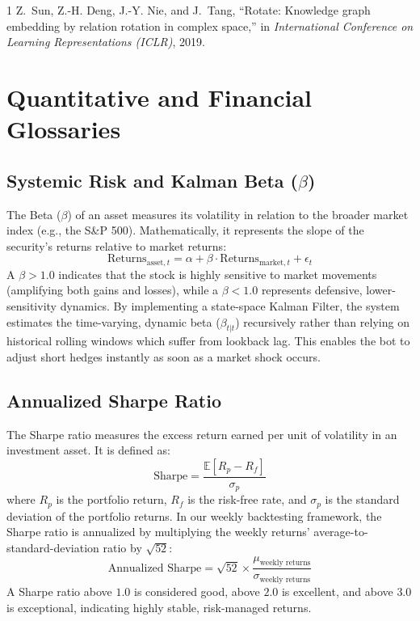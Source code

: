 \documentclass[10pt,journal,compsoc]{IEEEtran}
\begin{document}
\begin{thebibliography}{1}
Z.~Sun, Z.-H. Deng, J.-Y. Nie, and J.~Tang, ``Rotate: Knowledge graph embedding by relation rotation in complex space,'' in \emph{International Conference on Learning Representations (ICLR)}, 2019.
\end{thebibliography}

\clearpage
\appendices

\section{Quantitative and Financial Glossaries}

\subsection{Systemic Risk and Kalman Beta ($\beta$)}
The Beta ($\beta$) of an asset measures its volatility in relation to the broader market index (e.g., the S\&P 500). Mathematically, it represents the slope of the security's returns relative to market returns:
\begin{equation}
\text{Returns}_{\text{asset}, t} = \alpha + \beta \cdot \text{Returns}_{\text{market}, t} + \epsilon_t
\end{equation}
A $\beta > 1.0$ indicates that the stock is highly sensitive to market movements (amplifying both gains and losses), while a $\beta < 1.0$ represents defensive, lower-sensitivity dynamics. By implementing a state-space Kalman Filter, the system estimates the time-varying, dynamic beta ($\beta_{t|t}$) recursively rather than relying on historical rolling windows which suffer from lookback lag. This enables the bot to adjust short hedges instantly as soon as a market shock occurs.

\subsection{Annualized Sharpe Ratio}
The Sharpe ratio measures the excess return earned per unit of volatility in an investment asset. It is defined as:
\begin{equation}
\text{Sharpe} = \frac{\mathbb{E}[R_p - R_f]}{\sigma_p}
\end{equation}
where $R_p$ is the portfolio return, $R_f$ is the risk-free rate, and $\sigma_p$ is the standard deviation of the portfolio returns. In our weekly backtesting framework, the Sharpe ratio is annualized by multiplying the weekly returns' average-to-standard-deviation ratio by $\sqrt{52}$:
\begin{equation}
\text{Annualized Sharpe} = \sqrt{52} \times \frac{\mu_{\text{weekly returns}}}{\sigma_{\text{weekly returns}}}
\end{equation}
A Sharpe ratio above $1.0$ is considered good, above $2.0$ is excellent, and above $3.0$ is exceptional, indicating highly stable, risk-managed returns.
\end{document}
